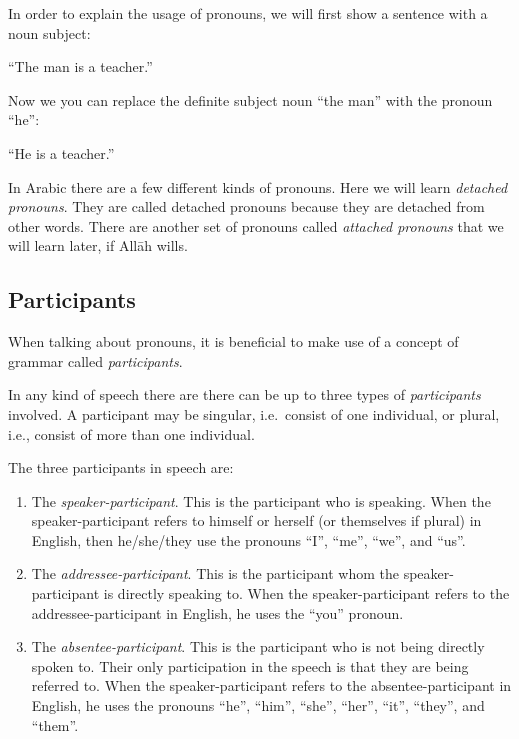 \documentclass[
  10pt,
]{book}
\providecommand{\tightlist}{%
  \setlength{\itemsep}{0pt}\setlength{\parskip}{0pt}}
\begin{document}
In order to explain the usage of pronouns, we will first show a sentence with a noun subject:

\enquote{The man is a teacher.}

Now we you can replace the definite subject noun \enquote{the man} with the pronoun \enquote{he}:

\enquote{He is a teacher.}

In Arabic there are a few different kinds of pronouns. Here we will learn \emph{detached pronouns}. They are called detached pronouns because they are detached from other words. There are another set of pronouns called \emph{attached pronouns} that we will learn later, if Allāh wills.

\subsection{Participants}\label{participants}

When talking about pronouns, it is beneficial to make use of a concept of grammar called \emph{participants}.

In any kind of speech there are there can be up to three types of \emph{participants} involved. A participant may be singular, i.e.~consist of one individual, or plural, i.e., consist of more than one individual.

The three participants in speech are:

\begin{enumerate}
\def\labelenumi{\arabic{enumi}.}
\tightlist
\item
  The \emph{speaker-participant}. This is the participant who is speaking. When the speaker-participant refers to himself or herself (or themselves if plural) in English, then he/she/they use the pronouns \enquote{I}, \enquote{me}, \enquote{we}, and \enquote{us}.
\item
  The \emph{addressee-participant}. This is the participant whom the speaker-participant is directly speaking to. When the speaker-participant refers to the addressee-participant in English, he uses the \enquote{you} pronoun.
\item
  The \emph{absentee-participant}. This is the participant who is not being directly spoken to. Their only participation in the speech is that they are being referred to. When the speaker-participant refers to the absentee-participant in English, he uses the pronouns \enquote{he}, \enquote{him}, \enquote{she}, \enquote{her}, \enquote{it}, \enquote{they}, and \enquote{them}.
\end{enumerate}
\end{document}

